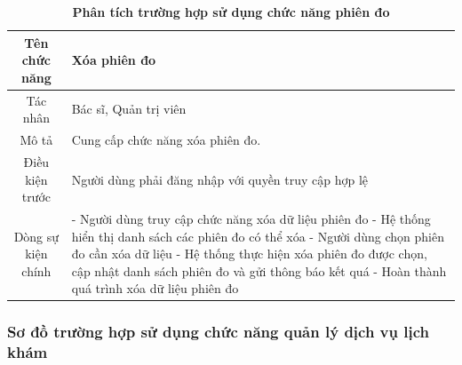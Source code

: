 \begin{table}[H]
	\caption{\bfseries \fontsize{12pt}{0pt}\selectfont Phân tích trường hợp sử dụng chức năng phiên đo}
	\centering
	\begin{tabularx}{0.9\textwidth}{|c|X|}
		\hline
		\textbf{Tên chức năng} & \textbf{Xóa phiên đo}                               \\
		\hline
		Tác nhân               & Bác sĩ, Quản trị viên                               \\
		\hline
		Mô tả                  & Cung cấp chức năng xóa phiên đo.                    \\
		\hline
		Điều kiện trước        & Người dùng phải đăng nhập với quyền truy cập hợp lệ \\
		\hline
		Dòng sự kiện chính     &
		- Người dùng truy cập chức năng xóa dữ liệu phiên đo \newline
		- Hệ thống hiển thị danh sách các phiên đo có thể xóa \newline
		- Người dùng chọn phiên đo cần xóa dữ liệu \newline
		- Hệ thống thực hiện xóa phiên đo được chọn, cập nhật danh sách phiên đo và gửi thông báo kết quá \newline
		- Hoàn thành quá trình xóa dữ liệu phiên đo                                  \\
		\hline
	\end{tabularx}
\end{table}

\subsubsection{Sơ đồ trường hợp sử dụng chức năng quản lý dịch vụ lịch khám}

